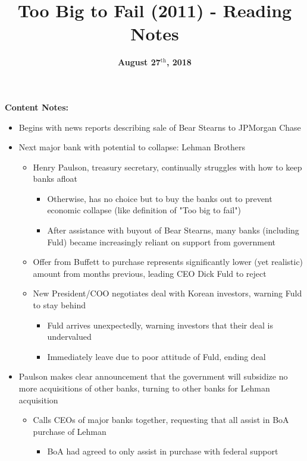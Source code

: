 \documentclass{article}
\title{\textbf{Too Big to Fail (2011) - Reading Notes}}
\date{\textbf{August 27$^\text{th}$, 2018}}
\begin{document}
    \maketitle
    \textbf{Content Notes: }
    \begin{itemize}
        \item Begins with news reports describing sale of Bear Stearns to JPMorgan Chase
        \item Next major bank with potential to collapse: Lehman Brothers
        \begin{itemize}
            \item Henry Paulson, treasury secretary, continually struggles with how to keep banks afloat
            \begin{itemize}
                \item Otherwise, has no choice but to buy the banks out to prevent economic collapse (like definition of "Too big to fail")
                \item After assistance with buyout of Bear Stearns, many banks (including Fuld) became increasingly reliant on support from government
            \end{itemize}
            \item Offer from Buffett to purchase represents significantly lower (yet realistic) amount from months previous, leading CEO Dick Fuld to reject
            \item New President/COO negotiates deal with Korean investors, warning Fuld to stay behind
            \begin{itemize}
                \item Fuld arrives unexpectedly, warning investors that their deal is undervalued
                \item Immediately leave due to poor attitude of Fuld, ending deal
            \end{itemize}
        \end{itemize}
        \item Paulson makes clear announcement that the government will subsidize no more acquisitions of other banks, turning to other banks for Lehman acquisition
        \begin{itemize}
            \item Calls CEOs of major banks together, requesting that all assist in BoA purchase of Lehman 
            \begin{itemize}
                \item BoA had agreed to only assist in purchase with federal support 

\end{itemize}
\end{itemize}
\end{itemize}
\end{document}
